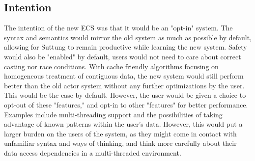 \subsection{Intention}
The intention of the new ECS was that it would be an "opt-in" system.
The syntax and semantics would mirror the old system as much as possible by default, allowing for Suttung to remain productive while learning the new system.
Safety would also be "enabled" by default, users would not need to care about correct casting nor race conditions.
With cache friendly algorithms focusing on homogeneous treatment of contiguous data,
the new system would still perform better than the old actor system without any further optimizations by the user.
This would be the case by default. 
However, the user would be given a choice to opt-out of these "features," and opt-in to other "features" for better performance.
Examples include multi-threading support and the possibilities of taking advantage of known patterns within the user's data.
However, this would put a larger burden on the users of the system, as they might come in contact with unfamiliar syntax and ways of thinking, and think more carefully about their data access dependencies in a multi-threaded environment.

